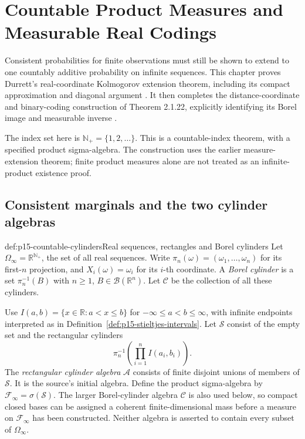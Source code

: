 \chapter{Countable Product Measures and Measurable Real Codings}
\label{sec:p15-countable-product-measures}

Consistent probabilities for finite observations must still be shown to
extend to one countably additive probability on infinite sequences. This
chapter proves Durrett's real-coordinate Kolmogorov extension theorem,
including its compact approximation and diagonal argument
\cite[thm.~2.1.21, p.~53; app.~A.3, pp.~464--466]{DurrettPTEAuthor2019}.
It then completes the distance-coordinate and binary-coding construction
of Theorem 2.1.22, explicitly identifying its Borel image and measurable
inverse \cite[p.~54]{DurrettPTEAuthor2019}.

The index set here is \(\mathbb N_+=\{1,2,\ldots\}\). This is a
countable-index theorem, with a specified product sigma-algebra. The
construction uses the earlier measure-extension theorem; finite product
measures alone are not treated as an infinite-product existence proof.

\section{Consistent marginals and the two cylinder algebras}
\label{sec:p15-cylinder-algebras}

\begin{hbdefinition}{def:p15-countable-cylinders}{Real sequences, rectangles and Borel cylinders}
Let \(\Omega_\infty=\mathbb R^{\mathbb N_+}\), the set of all
real sequences. Write \(\pi_n(\omega)=(\omega_1,\ldots,\omega_n)\)
for its first-\(n\) projection, and \(X_i(\omega)=\omega_i\)
for its \(i\)-th coordinate. A \emph{Borel cylinder} is a set
\(\pi_n^{-1}(B)\) with \(n\geq1\), \(B\in\mathcal B(\mathbb R^n)\).
Let \(\mathcal C\) be the collection of all these cylinders.

Use \(I(a,b)=\{x\in\mathbb R:a<x\leq b\}\) for
\(-\infty\leq a<b\leq\infty\), with infinite endpoints interpreted
as in Definition~\ref{def:p15-stieltjes-intervals}.
Let \(\mathcal S\) consist of the empty set and the rectangular cylinders
\[
 \pi_n^{-1}\left(\prod_{i=1}^n I(a_i,b_i)\right).
\]
The \emph{rectangular cylinder algebra} \(\mathcal A\) consists of
finite disjoint unions of members of \(\mathcal S\). It is the
source's initial algebra. Define the product sigma-algebra by
\(\mathcal F_\infty=\sigma(\mathcal S)\).
The larger Borel-cylinder algebra \(\mathcal C\) is also used below,
so compact closed bases can be assigned a coherent finite-dimensional
mass before a measure on \(\mathcal F_\infty\) has been constructed.
Neither algebra is asserted to contain every subset of \(\Omega_\infty\).
\end{hbdefinition}

